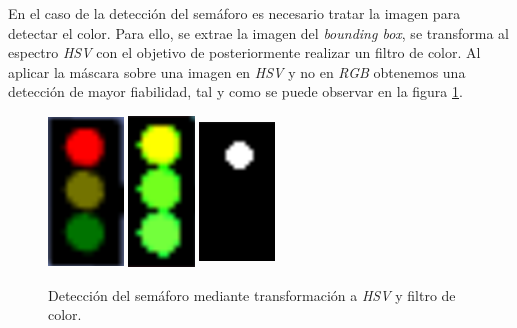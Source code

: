 
En el caso de la detección del semáforo es necesario tratar la imagen para detectar el color. Para ello, se extrae la imagen del \textit{bounding box}, se transforma al espectro \textit{HSV} con el objetivo de posteriormente realizar un filtro de color. Al aplicar la máscara sobre una imagen en \textit{HSV} y no en \textit{RGB} obtenemos una detección de mayor fiabilidad, tal y como se puede observar en la figura \ref{fig:detector}.\\

\begin{figure} [h!]
	\begin{center}
		\includegraphics[width=2cm, height=4cm]{figs/cropped}\includegraphics[width=2cm, height=4cm]{figs/hsv}\includegraphics[width=2cm, height=4cm]{figs/mask}
	\end{center}
	\caption{Detección del semáforo mediante transformación a \textit{HSV} y filtro de color.}
	\label{fig:detector}
\end{figure}\

